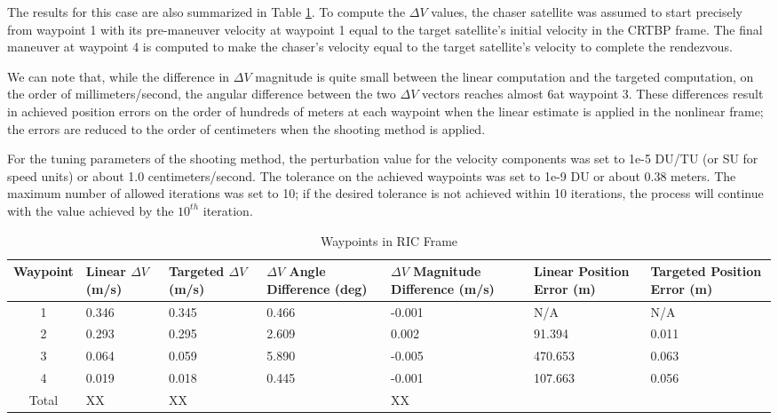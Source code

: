\documentclass[a4paper]{article}
\begin{document}
The results for this case are also summarized in Table \ref{tab:Results_1}.  To compute the \(\Delta V\) values, the chaser satellite was assumed to start precisely from waypoint 1 with its pre-maneuver velocity at waypoint 1 equal to the target satellite's initial velocity in the CRTBP frame.  The final maneuver at waypoint 4 is computed to make the chaser's velocity equal to the target satellite's velocity to complete the rendezvous.

We can note that, while the difference in \(\Delta V\) magnitude is quite small between the linear computation and the targeted computation, on the order of millimeters/second, the angular difference between the two \(\Delta V\) vectors reaches almost 6\textdegree at waypoint 3.  These differences result in achieved position errors on the order of hundreds of meters at each waypoint when the linear estimate is applied in the nonlinear frame; the errors are reduced to the order of centimeters when the shooting method is applied.

For the tuning parameters of the shooting method, the perturbation value for the velocity components was set to 1e-5 DU/TU (or SU for speed units) or about 1.0 centimeters/second.  The tolerance on the achieved waypoints was set to 1e-9 DU or about 0.38 meters.  The maximum number of allowed iterations was set to 10; if the desired tolerance is not achieved within 10 iterations, the process will continue with the value achieved by the \(10^{th}\) iteration.

\begin{table}[h] \label{tab:Results_1}
	\begin{center}
		\begin{tabular}{c p{1cm} p{1cm} p{1.5cm} p{1.5cm} p{1.5cm} p{1.5cm}}
			\toprule
			Waypoint   & Linear \(\Delta V\) (m/s) & Targeted \(\Delta V\) (m/s) & \(\Delta V\) Angle Difference (deg) & \(\Delta V\) Magnitude Difference (m/s) & Linear Position Error (m) & Targeted Position Error (m) \\
			\midrule
			1 & 0.346 &	0.345 &	0.466 &	-0.001 &	N/A &	N/A \\
			2 & 0.293 &	0.295 &	2.609 &	0.002 &	91.394 &	0.011 \\
			3 & 0.064 &	0.059 &	5.890 &	-0.005 &	470.653 &	0.063 \\
			4 & 0.019 &	0.018 &	0.445 &	-0.001 &	107.663 &	0.056 \\
			Total & XX  & XX &  & XX &  & \\
			\bottomrule
		\end{tabular}
		\caption{Waypoints in RIC Frame}
	\end{center}
\end{table}
\end{document}
